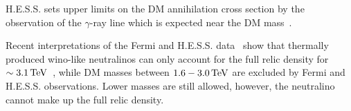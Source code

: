 H.E.S.S. sets upper limits on the DM annihilation cross section by the observation of the $\gamma$-ray line which is expected near the DM mass~\cite{bib:HESS_DM}.

Recent interpretations of the Fermi and H.E.S.S. data~\cite{bib:IndirectSearches_Fan_2013,bib:IndirectSearches_Cohen_2013,bib:IndirectSearches_Hryczuk_2014,bib:IndirectSearches_Beneke_2015} show that thermally produced wino-like neutralinos can only account for the full relic density for $\sim3.1\,\text{Te}\kern-0.06667em\text{V}$~\cite{bib:IndirectSearches_Cohen_2013}, while DM masses between $1.6-3.0\,\text{Te}\kern-0.06667em\text{V}$ are excluded by Fermi and H.E.S.S. observations.
Lower masses are still allowed, however, the neutralino cannot make up the full relic density.


